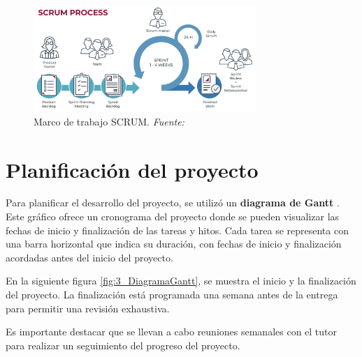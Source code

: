 \begin{figure}[hp!]
  \centering
  \includegraphics[width=0.75\textwidth]{imaxes/3_SCRUM.png}
  \caption[Marco de trabajo SCRUM]{Marco de trabajo SCRUM. \textit{Fuente: \cite{AusumScrum2024}}}
  \label{fig:3_SCRUM}
\end{figure}


\section{Planificación del proyecto}

Para planificar el desarrollo del proyecto, se utilizó un \textbf{diagrama de Gantt} \cite{diagramaGantt}. Este gráfico ofrece un cronograma del proyecto donde se pueden visualizar las fechas de inicio y finalización de las tareas y hitos. Cada tarea se representa con una barra horizontal que indica su duración, con fechas de inicio y finalización acordadas antes del inicio del proyecto.

En la siguiente figura \ref{fig:3_DiagramaGantt}, se muestra el inicio y la finalización del proyecto. La finalización está programada una semana antes de la entrega para permitir una revisión exhaustiva.

Es importante destacar que se llevan a cabo reuniones semanales con el tutor para realizar un seguimiento del progreso del proyecto.

